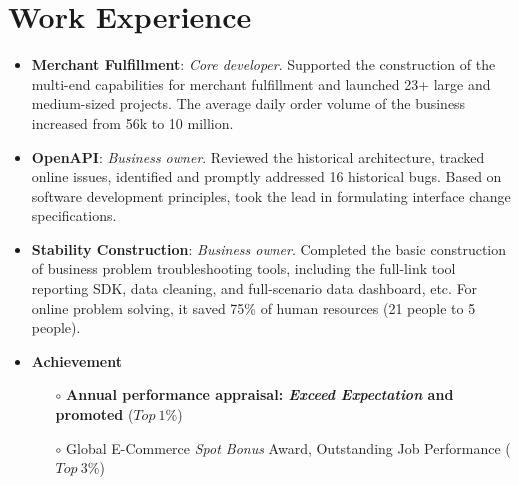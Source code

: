 \documentclass{resume}
\begin{document}
\section{Work Experience}
\begin{itemize}[parsep=0.2ex]
    \item \textbf{Merchant Fulfillment}: \textit{Core developer}. Supported the construction of the multi-end capabilities for 
    merchant fulfillment and launched 23+ large and medium-sized projects. The average daily order volume of the business 
    increased from 56k to 10 million.
    \item \textbf{OpenAPI}: \textit{Business owner}. Reviewed the historical architecture, tracked online issues, identified 
    and promptly addressed 16 historical bugs. Based on software development principles, took the lead in formulating interface 
    change specifications.
    \item \textbf{Stability Construction}: \textit{Business owner}. Completed the basic construction of business problem 
    troubleshooting tools, including the full-link tool reporting SDK, data cleaning, and full-scenario data dashboard, etc. 
    For online problem solving, it saved 75\% of human resources (21 people to 5 people).
    \item \textbf{Achievement}
      \begin{itemize}
          \item[$\circ$] \textbf{Annual performance appraisal: \textit{Exceed Expectation} and promoted} ($Top\ 1\%$)
          \item[$\circ$] Global E-Commerce \textit{Spot Bonus} Award, Outstanding Job Performance ($Top\ 3\%$)
      \end{itemize}
\end{itemize}
\end{document}
